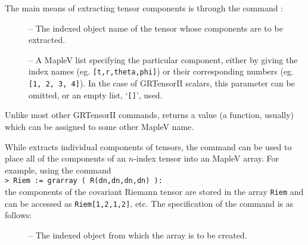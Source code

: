 \documentclass{article}
\begin{document}
{{{The main means of extracting tensor components is through the command
:\\
%
\begin{cmdspec}
  \label{spec:grcomponent}

  \begin{description}
    \item[] -- The indexed object name of the tensor whose
      components are to be extracted.
    \item[] -- A MapleV list specifying the particular
      component, either by giving the index names (eg. 
      \texttt{[t,r,theta,phi]}) or their corresponding 
      numbers (eg. \texttt{[1, 2, 3, 4]}).
      In the case of GRTensorII scalars, this parameter can be omitted, or
      an empty list, `\texttt{[]}', used.
  \end{description}

\end{cmdspec}

Unlike most other GRTensorII commands,  returns a
value (a function, usually) which can be assigned to some other MapleV name.

While  extracts individual components of tensors, the
command  can be used to place all of the components of
an $n$-index tensor into an MapleV array. For example, using the command\\

\noindent\texttt{> Riem := grarray ( R(dn,dn,dn,dn) ):}\\

\noindent the components of the covariant Riemann tensor are stored in
the array \texttt{Riem} and can be accessed as \texttt{Riem[1,2,1,2]}, etc.
The specification of the  command is as follows:
%
\begin{cmdspec}
  \label{spec:grarray}

  \begin{description}
    \item[] -- The indexed object from which the array is
      to be created.
  \end{description}

\end{cmdspec}

}}}
\end{document}
